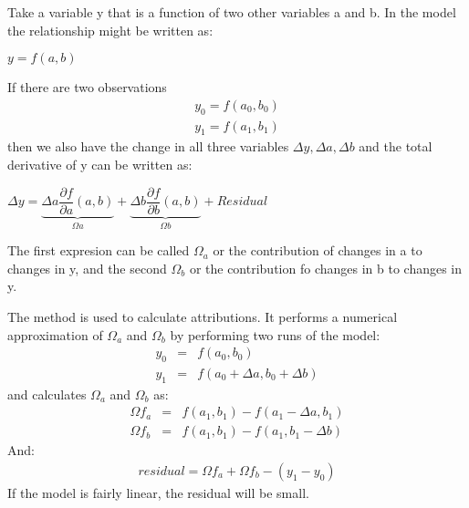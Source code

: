 \documentclass[letterpaper,10pt,english]{jupyterBook}
\begin{document}
\sphinxAtStartPar
Take a variable y that is a function of two other variables a and b.  In the model the relationship might be written as:

\sphinxAtStartPar
\(y = f(a,b)\)

\sphinxAtStartPar
If there are two observations
\label{equation:content/06_ModelAnalytics/Attribution:1d6f84c5-b494-48a1-94e8-732bfac68f9b}\begin{eqnarray}
y_0 = f(a_0,b_0)\\
y_1 = f(a_1,b_1)
\end{eqnarray}
\sphinxAtStartPar
then we also have the change in all three variables \(\Delta y, \Delta a, \Delta b\) and the total derivative of y can be written as:

\sphinxAtStartPar
\(\Delta y = \underbrace{\Delta a \dfrac{\partial {f}}{\partial{a}}(a,b)}_{\Omega a} + 
\underbrace{\Delta b \dfrac{\partial {f}}{\partial{b}}(a,b)}_{\Omega b}+Residual\)

\sphinxAtStartPar
The first expresion can be called \(\Omega_a\) or the contribution of changes in a to changes in y, and the second \(\Omega_b\)  or the contribution fo changes in b to changes in y.

\sphinxAtStartPar
The  method  is used to calculate attributions. It performs a numerical approximation of \(\Omega_a\) and \(\Omega_b\) by performing two runs of the model:
\label{equation:content/06_ModelAnalytics/Attribution:f70fb8f2-a09c-4e03-8415-2d13afdcf92a}\begin{eqnarray}  
y_0&=&f(a_{0},b_{0}) \\
y_1&=&f(a_0+\Delta a,b_{0}+ \Delta b)
\end{eqnarray}
\sphinxAtStartPar
and calculates \(\Omega_a\) and \(\Omega_b\) as:
\label{equation:content/06_ModelAnalytics/Attribution:7566b3e8-e196-4053-8677-1b3fd5f6eb08}\begin{eqnarray}  
\Omega f_a&=&f(a_1,b_1 )-f(a_1-\Delta a,b_1) \\
\Omega f_b&=&f(a_1,b_1 )-f(a_1,b_1-\Delta  b)
\end{eqnarray}
\sphinxAtStartPar
And:
\label{equation:content/06_ModelAnalytics/Attribution:a63ad1fc-7a7f-40c0-a128-dff40a95425f}\begin{eqnarray}
residual = \Omega f_a + \Omega f_b -(y_1 - y_0) 
\end{eqnarray}
\sphinxAtStartPar
If the model is fairly linear, the residual will be small.
\end{document}
